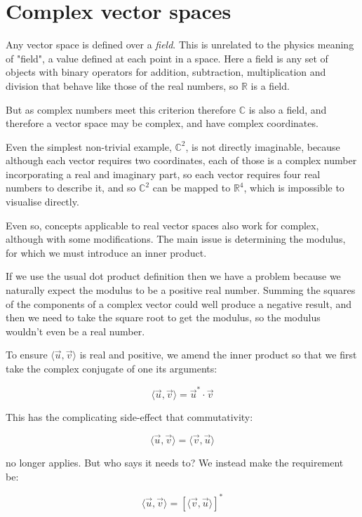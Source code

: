 \section{Complex vector spaces}\label{ch:vectors-complex}

Any vector space is defined over a \textit{field}. This is unrelated to the physics meaning of "field", a value defined at each point in a space. Here a field is any set of objects with binary operators for addition, subtraction, multiplication and division that behave like those of the real numbers, so $\mathbb{R}$ is a field.

But as complex numbers meet this criterion therefore $\mathbb{C}$ is also a field, and therefore a vector space may be complex, and have complex coordinates.

Even the simplest non-trivial example, $\mathbb{C}^2$, is not directly imaginable, because although each vector requires two coordinates, each of those is a complex number incorporating a real and imaginary part, so each vector requires four real numbers to describe it, and so $\mathbb{C}^2$ can be mapped to $\mathbb{R}^4$, which is impossible to visualise directly.

Even so, concepts applicable to real vector spaces also work for complex, although with some modifications. The main issue is determining the modulus, for which we must introduce an inner product.

If we use the usual dot product definition then we have a problem because we naturally expect the modulus to be a positive real number. Summing the squares of the components of a complex vector could well produce a negative result, and then we need to take the square root to get the modulus, so the modulus wouldn't even be a real number.

To ensure $\langle \vec{u}, \vec{v} \rangle$ is real and positive, we amend the inner product so that we first take the complex conjugate of one its arguments:

$$
\langle \vec{u}, \vec{v} \rangle
=
\vec{u}^* \cdot \vec{v}
$$

This has the complicating side-effect that commutativity:

$$
\langle \vec{u}, \vec{v} \rangle
=
\langle \vec{v}, \vec{u} \rangle
$$

no longer applies. But who says it needs to? We instead make the requirement be:

$$
\langle \vec{u}, \vec{v} \rangle
=
\left[ \langle \vec{v}, \vec{u} \rangle \right]^*
$$

